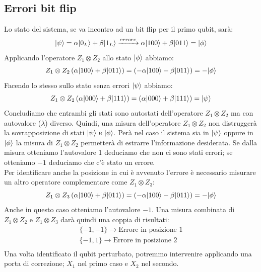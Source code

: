 \documentclass[12pt, a4paper]{report}
\begin{document}
\subsection{Errori bit flip}
Lo stato del sistema, se va incontro ad un bit flip per il primo qubit, sarà:
\begin{equation*}
    | \psi \rangle = \alpha| 0_{L} \rangle + \beta| 1_{L} \rangle \xrightarrow{errore} \alpha| 100 \rangle + \beta| 011 \rangle = | \phi \rangle
\end{equation*}
Applicando l'operatore $Z_{1}\otimes Z_{2}$ allo stato $| \phi \rangle$ abbiamo:
\begin{equation*}
    Z_{1}\otimes Z_{2}\left(\alpha| 100 \rangle + \beta| 011 \rangle\right) = \left(-\alpha| 100 \rangle-\beta| 011 \rangle\right) = -| \phi \rangle
\end{equation*}
Facendo lo stesso sullo stato senza errori $| \psi \rangle$ abbiamo:
\begin{equation*}
    Z_{1}\otimes Z_{2}\left(\alpha| 000 \rangle + \beta| 111 \rangle\right) = \left(\alpha| 000 \rangle+\beta| 111 \rangle\right) = | \psi \rangle
\end{equation*}
Concludiamo che entrambi gli stati sono autostati dell'operatore $Z_{1}\otimes Z_{2}$ ma con autovalore ($\lambda$) diverso. Quindi, una misura dell'operatore $Z_{1}\otimes Z_{2}$ non distruggerà la sovrapposizione di stati $| \psi \rangle\text{ e }| \phi \rangle$. Perà nel caso il sistema sia in  $| \psi \rangle$ oppure in $| \phi \rangle$ la misura di $Z_{1}\otimes Z_{2}$ permetterà di estrarre l'informazione desiderata. Se dalla misura otteniamo l'autovalore 1 deduciamo che non ci sono stati errori; se otteniamo $-1$ deduciamo che c'è stato un errore.\\
Per identificare anche la posizione in cui è avvenuto l'errore è necessario misurare un altro operatore complementare come $Z_{1}\otimes Z_{3}$:
\begin{equation*}
    Z_{1}\otimes Z_{3}\left(\alpha| 100 \rangle + \beta| 011 \rangle\right) = \left(-\alpha| 100 \rangle-\beta| 011 \rangle\right) = -| \phi \rangle
\end{equation*}
Anche in questo caso otteniamo l'autovalore $-1$. Una misura combinata di $Z_{1}\otimes Z_{2}$ e $Z_{1}\otimes Z_{3}$ darà quindi una coppia di risultati:
\begin{equation*}
    \begin{split}
        \{-1,-1\} \rightarrow \text{Errore in posizione 1} \\
        \{-1,1\} \rightarrow \text{Errore in posizione 2} \\
    \end{split}
\end{equation*}
Una volta identificato il qubit perturbato, potremmo intervenire applicando una porta di correzione; $X_{1}$ nel primo caso e $X_{2}$ nel secondo.
\end{document}
